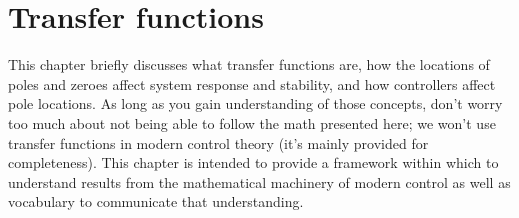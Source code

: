 
\chapter{Transfer functions}

This chapter briefly discusses what transfer functions are, how the locations of
poles and zeroes affect \gls{system response} and stability, and how controllers
affect pole locations. As long as you gain understanding of those concepts,
don't worry too much about not being able to follow the math presented here; we
won't use transfer functions in modern control theory (it's mainly provided for
completeness). This chapter is intended to provide a framework within which to
understand results from the mathematical machinery of modern control as well as
vocabulary to communicate that understanding.

\renewcommand*{\chapterpath}{\partpath/transfer-functions}





